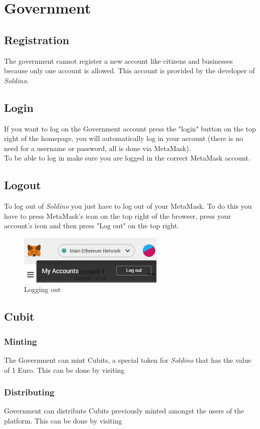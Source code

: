 \section{Government}
	\subsection{Registration}
	The government cannot register a new account like citizens and 
	businesses because only one account is allowed. This account is provided 
	by the developer of \textit{Soldino}.
	\subsection{Login}
	If you want to log on the Government account press the "login" button on the 
	top right of the homepage, you will automatically log in your account 
	(there is no need for a username or password, all is done via MetaMask). 
	\\To be able to log in make sure you are logged in the correct MetaMask 
	account.
	\subsection{Logout}
	To log out of \textit{Soldino} you just have to log out of 
	your MetaMask. To do this you have to press MetaMask's icon on the top 
	right of the browser, press your account's icon and then press "Log out"
	on the top right.
	\begin{figure}[H]
		\includegraphics[width=7cm]{res/images/logout_metamask.png}
		\centering
		\caption{Logging out}
	\end{figure}
	\subsection{Cubit}
		\subsubsection{Minting}
		The Government can mint Cubits, a special token for \textit{Soldino} 
		that has the value of 1 Euro. This can be done by visiting 
		
		\subsubsection{Distributing}
		Government can distribute Cubits previously minted amongst the users of 
		the platform. This can be done by visiting 
		
